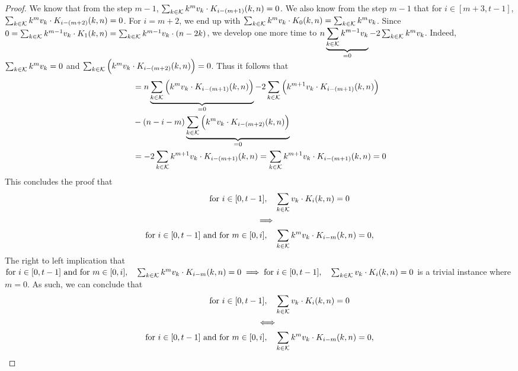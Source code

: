 \begin{proof}
    We know that from the step $m-1$, $\sum_{k \in \mathcal{K}} k^mv_k \cdot K_{i - (m+1)}(k, n) = 0$. We also know from the step $m-1$ that for $i \in [m+3, t-1]$, $\sum_{k \in \mathcal{K}} k^mv_k \cdot K_{i - (m+2)}(k, n) = 0$. For $i = m + 2$, we end up with $\sum_{k \in \mathcal{K}} k^mv_k \cdot K_0(k, n) = \sum_{k \in \mathcal{K}} k^mv_k$. Since $0 = \sum_{k \in \mathcal{K}} k^{m-1}v_k \cdot K_1(k, n) = \sum_{k \in \mathcal{K}} k^{m-1}v_k \cdot (n - 2k)$, we develop one more time to $n\underbrace{\sum_{k \in \mathcal{K}} k^{m-1}v_k}_{=0} - 2\sum_{k \in \mathcal{K}} k^mv_k$. Indeed, $\sum_{k \in \mathcal{K}} k^mv_k = 0$ and $\sum_{k \in \mathcal{K}} \Big( k^mv_k \cdot K_{i - (m+2)}(k, n) \Big) = 0$. Thus it follows that
    \begin{equation*}
    \begin{split}
        & = n \underbrace{\sum_{k \in \mathcal{K}} \Big( k^mv_k \cdot K_{i - (m+1)}(k, n) \Big)}_{=0} - 2\sum_{k \in \mathcal{K}} \Big( k^{m+1}v_k \cdot K_{i - (m+1)}(k, n) \Big)\\& - (n - i - m)\underbrace{\sum_{k \in \mathcal{K}} \Big( k^mv_k \cdot K_{i - (m+2)}(k, n) \Big)}_{=0}\\
        &= -2\sum_{k \in \mathcal{K}} k^{m+1}v_k \cdot K_{i - (m+1)}(k, n) = \sum_{k \in \mathcal{K}} k^{m+1}v_k \cdot K_{i - (m+1)}(k, n) = 0
    \end{split}
    \end{equation*}
    This concludes the proof that
    \begin{equation*}
        \begin{split}
            \text{for } i \in [0, t-1], \quad &\sum_{k \in \mathcal{K}} v_k \cdot K_i(k, n) = 0\\
            \implies\\
            \text{for } i \in [0, t-1] \text{ and for } m \in [0, i], \quad &\sum_{k \in \mathcal{K}} k^mv_k \cdot K_{i-m}(k, n) = 0,
        \end{split}
    \end{equation*}
    The right to left implication that $\text{for } i \in [0, t-1] \text{ and for } m \in [0, i], \quad \sum_{k \in \mathcal{K}} k^mv_k \cdot K_{i-m}(k, n) = 0 \implies \text{for } i \in [0, t-1], \quad \sum_{k \in \mathcal{K}} v_k \cdot K_i(k, n) = 0$ is a trivial instance where $m = 0$. As such, we can conclude that
    \begin{equation*}
        \begin{split}
            \text{for } i \in [0, t-1], \quad &\sum_{k \in \mathcal{K}} v_k \cdot K_i(k, n) = 0\\
            \Longleftrightarrow\\
            \text{for } i \in [0, t-1] \text{ and for } m \in [0, i], \quad &\sum_{k \in \mathcal{K}} k^mv_k \cdot K_{i-m}(k, n) = 0,
        \end{split}
    \end{equation*}


\end{proof}
